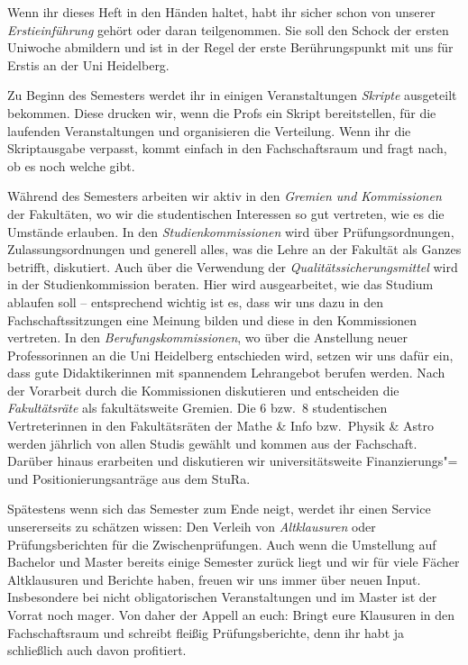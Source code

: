 Wenn ihr dieses Heft in den Händen haltet, habt ihr sicher schon von unserer \emph{Erstieinführung} gehört oder daran teilgenommen. Sie soll den Schock der ersten Uniwoche abmildern und ist in der Regel der erste Berührungspunkt mit uns für Erstis an der Uni Heidelberg.

Zu Beginn des Semesters werdet ihr in einigen Veranstaltungen \emph{Skripte} ausgeteilt bekommen. Diese drucken wir, wenn die Profs ein Skript bereitstellen, für die laufenden Veranstaltungen und organisieren die Verteilung. Wenn ihr die Skriptausgabe verpasst, kommt einfach in den Fachschaftsraum und fragt nach, ob es noch welche gibt.

Während des Semesters arbeiten wir aktiv in den \emph{Gremien und Kommissionen} der Fakultäten, wo wir die studentischen Interessen so gut vertreten, wie es die Umstände erlauben. In den \emph{Studienkommissionen} wird über Prüfungsordnungen, Zulassungsordnungen und generell alles, was die Lehre an der Fakultät als Ganzes betrifft, diskutiert. Auch über die Verwendung der \emph{Qualitätssicherungsmittel} wird in der Studienkommission beraten. Hier wird ausgearbeitet, wie das Studium ablaufen soll -- entsprechend wichtig ist es, dass wir uns dazu in den Fachschaftssitzungen eine Meinung bilden und diese in den Kommissionen vertreten. In den \emph{Berufungskommissionen}, wo über die Anstellung neuer Professorinnen an die Uni Heidelberg entschieden wird, setzen wir uns dafür ein, dass gute Didaktikerinnen mit spannendem Lehrangebot berufen werden. Nach der Vorarbeit durch die Kommissionen diskutieren und entscheiden die \emph{Fakultätsräte} als fakultätsweite Gremien. Die 6 bzw.~8 studentischen Vertreterinnen in den Fakultätsräten der Mathe \& Info bzw.~Physik \& Astro werden jährlich von allen Studis gewählt und kommen aus der Fachschaft. Darüber hinaus erarbeiten und diskutieren wir universitätsweite Finanzierungs"= und Positionierungsanträge aus dem \gls{StuRa}.

Spätestens wenn sich das Semester zum Ende neigt, werdet ihr einen Service unsererseits zu schätzen wissen: Den Verleih von \emph{Altklausuren} oder Prüfungsberichten für die Zwischenprüfungen. Auch wenn die Umstellung auf Bachelor und Master bereits einige Semester zurück liegt und wir für viele Fächer Altklausuren und Berichte haben, freuen wir uns immer über neuen Input. Insbesondere bei nicht obligatorischen Veranstaltungen und im Master ist der Vorrat noch mager. Von daher der Appell an euch: Bringt eure Klausuren in den Fachschaftsraum und schreibt fleißig Prüfungsberichte, denn ihr habt ja schließlich auch davon profitiert.


